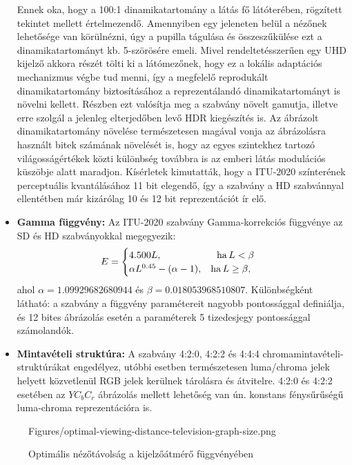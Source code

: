 \begin{itemize}
Ennek oka, hogy a 100:1 dinamikatartomány a látás fő látóterében, rögzített tekintet mellett értelmezendő.
Amennyiben egy jeleneten belül a nézőnek lehetősége van körülnézni, úgy a pupilla tágulása és összeszűkülése ezt a dinamikatartományt kb. 5-szörösére emeli.
Mivel rendeltetésszerűen egy UHD kijelző akkora részét tölti ki a látómezőnek, hogy ez a lokális adaptációs mechanizmus végbe tud menni, így a megfelelő reprodukált dinamikatartomány biztosításához a reprezentálandó dinamikatartományt is növelni kellett.
Részben ezt valósítja meg a szabvány növelt gamutja, illetve erre szolgál a jelenleg elterjedőben levő HDR kiegészítés is.
Az ábrázolt dinamikatartomány növelése természetesen magával vonja az ábrázolásra használt bitek számának növelését is, hogy az egyes szintekhez tartozó világosságértékek közti különbség továbbra is az emberi látás modulációs küszöbje alatt maradjon.
Kísérletek kimutatták, hogy a  ITU-2020 színterének perceptuális kvantálásához 11 bit elegendő, így a szabvány a HD szabvánnyal ellentétben már kizárólag 10 és 12 bit reprezentációt ír elő.
\item \textbf{Gamma függvény:} Az ITU-2020 szabvány Gamma-korrekciós függvénye az SD és HD szabványokkal megegyezik:
\begin{equation}
E = 
\begin{cases}
4.500 L, \hspace{20mm} \mathrm{ha}\, L < \beta \\
\alpha L^{0.45} - (\alpha - 1 ), \hspace{3mm} \mathrm{ha}\, L \geq \beta,
\end{cases}
\end{equation}
ahol $\alpha = 1.09929682680944$ és $\beta = 0.018053968510807$.
Különbségként látható: a szabvány a függvény paramétereit nagyobb pontossággal definiálja, és 12 bites ábrázolás esetén a paraméterek 5 tizedesjegy pontossággal számolandók.
\item \textbf{Mintavételi struktúra:} A szabvány 4:2:0, 4:2:2 és 4:4:4 chromamintavételi-struktúrákat engedélyez, utóbbi esetben természetesen luma/chroma jelek helyett közvetlenül RGB jelek kerülnek tárolásra és átvitelre.
4:2:0 és 4:2:2 esetében az $YC_bC_r$ ábrázolás mellett lehetőség van ún. konstans fénysűrűségű luma-chroma reprezentációra is.
\end{itemize}

\begin{figure}[]
	\centering
	\begin{overpic}[width = 0.75 \columnwidth ]{Figures/optimal-viewing-distance-television-graph-size.png}
	\small
	\end{overpic}
	\caption{Optimális nézőtávolság a kijelzőátmérő függvényében}
	\label{Fig:optimal_vd_2}
\end{figure}

